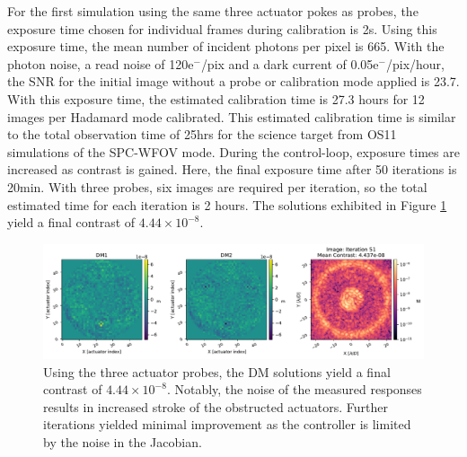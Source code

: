 \documentclass[12pt]{spieman}  %
\newcommand{\electron}{$\text{e}^-$}
\begin{document}
\begin{spacing}{2}
For the first simulation using the same three actuator pokes as probes, the exposure time chosen for individual frames during calibration is 2s. Using this exposure time, the mean number of incident photons per pixel is 665. With the photon noise, a read noise of 120\electron/pix and a dark current of 0.05\electron/pix/hour, the SNR for the initial image without a probe or calibration mode applied is 23.7. With this exposure time, the estimated calibration time is 27.3 hours for 12 images per Hadamard mode calibrated. This estimated calibration time is similar to the total observation time of 25hrs for the science target from OS11 simulations of the SPC-WFOV mode\cite{krist-spc-wfov-os11}. During the control-loop, exposure times are increased as contrast is gained. Here, the final exposure time after 50 iterations is 20min. With three probes, six images are required per iteration, so the total estimated time for each iteration is 2 hours. The solutions exhibited in Figure \ref{fig:spc-band4b-poke-probes} yield a final contrast of $4.44\times10^{-8}$. 

\begin{figure}[h]
    \centering
    \includegraphics[scale=0.5]{figs-spc-band4b/had_modes_3pokes.pdf}
    \caption{Using the three actuator probes, the DM solutions yield a final contrast of $4.44\times10^{-8}$. Notably, the noise of the measured responses results in increased stroke of the obstructed actuators. Further iterations yielded minimal improvement as the controller is limited by the noise in the Jacobian.}
    \label{fig:spc-band4b-poke-probes}
\end{figure}


\end{spacing}
\end{document}
